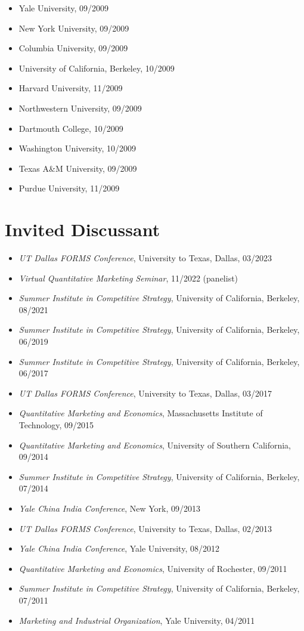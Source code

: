 \documentclass[margin, line, centered, 10pt]{res}
\begin{document}
\begin{resume}
\begin{itemize}
\item Yale University, 09/2009
\item New York University, 09/2009
\item Columbia University, 09/2009
\item University of California, Berkeley, 10/2009
\item Harvard University, 11/2009
\item Northwestern University, 09/2009
\item Dartmouth College, 10/2009
\item Washington University, 10/2009
\item Texas A\&M University, 09/2009
\item Purdue University, 11/2009
\end{itemize}

\section{\sc Invited Discussant}
\begin{itemize}
\item \textit{UT Dallas FORMS Conference}, University to Texas, Dallas, 03/2023
\item \textit{Virtual Quantitative Marketing Seminar}, 11/2022  (panelist)
\item \textit{Summer Institute in Competitive Strategy}, University of California, Berkeley, 08/2021 %
\item \textit{Summer Institute in Competitive Strategy}, University of California, Berkeley, 06/2019 %
\item \textit{Summer Institute in Competitive Strategy}, University of California, Berkeley, 06/2017
\item \textit{UT Dallas FORMS Conference}, University to Texas, Dallas, 03/2017
\item \textit{Quantitative Marketing and Economics}, Massachusetts Institute of Technology, 09/2015
\item \textit{Quantitative Marketing and Economics}, University of Southern California, 09/2014
\item \textit{Summer Institute in Competitive Strategy}, University of California, Berkeley, 07/2014
\item \textit{Yale China India Conference}, New York, 09/2013
\item \textit{UT Dallas FORMS Conference}, University to Texas, Dallas, 02/2013
\item \textit{Yale China India Conference}, Yale University, 08/2012
\item \textit{Quantitative Marketing and Economics}, University of Rochester, 09/2011
\item \textit{Summer Institute in Competitive Strategy}, University of California, Berkeley, 07/2011
\item \textit{Marketing and Industrial Organization}, Yale University, 04/2011
\end{itemize}



\end{resume}
\end{document}
